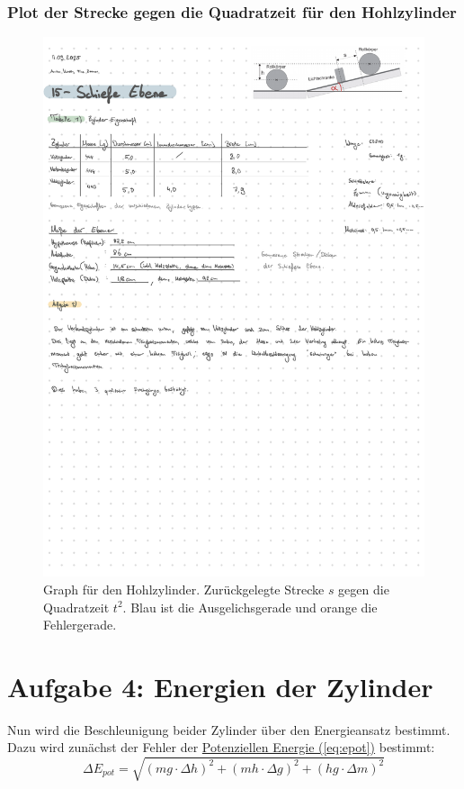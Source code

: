 \subsubsection*{Plot der Strecke gegen die Quadratzeit für den Hohlzylinder}
\begin{figure}[!ht]
    \centering
    \hspace*{-2.35cm}
    \includegraphics[width=1.3\textwidth, page=4]{Protokolle/15/Chapter/Messprotokoll}
    \caption{Graph für den Hohlzylinder. Zurückgelegte Strecke $s$ gegen die Quadratzeit $t^2$. Blau ist die Ausgelichsgerade und orange die Fehlergerade.}
    \label{fig:hohl}
\end{figure}

\twocolumn

\section{Aufgabe 4: Energien der Zylinder}
Nun wird die Beschleunigung beider Zylinder über den Energieansatz bestimmt. Dazu wird zunächst der Fehler der \hyperref[eq:epot]{Potenziellen Energie (\ref*{eq:epot})} bestimmt:
\begin{equation}
    \Delta E_{pot} = \sqrt{\left(mg \cdot \Delta h \right)^2 + \left(mh \cdot \Delta g \right)^2 + \left(hg \cdot \Delta m \right)^2}
\end{equation}

